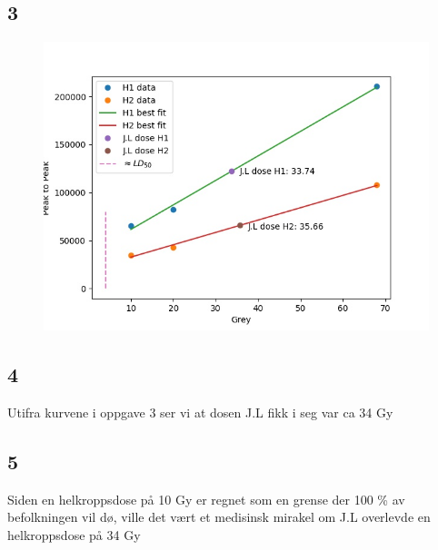 \documentclass[a4paper, 12pt]{article}
\begin{document}
\subsection*{3}
\begin{figure}[H]
\centering
\includegraphics[scale=.6]{JL.jpg}
\end{figure}
\subsection*{4} 	
Utifra kurvene i oppgave 3 ser vi at dosen J.L fikk i seg var ca 34 Gy
\subsection*{5} 	
Siden en helkroppsdose på 10 Gy er regnet som en grense der 100 \% av befolkningen vil dø, ville det vært et medisinsk mirakel om J.L overlevde en helkroppsdose på 34 Gy
\end{document}
